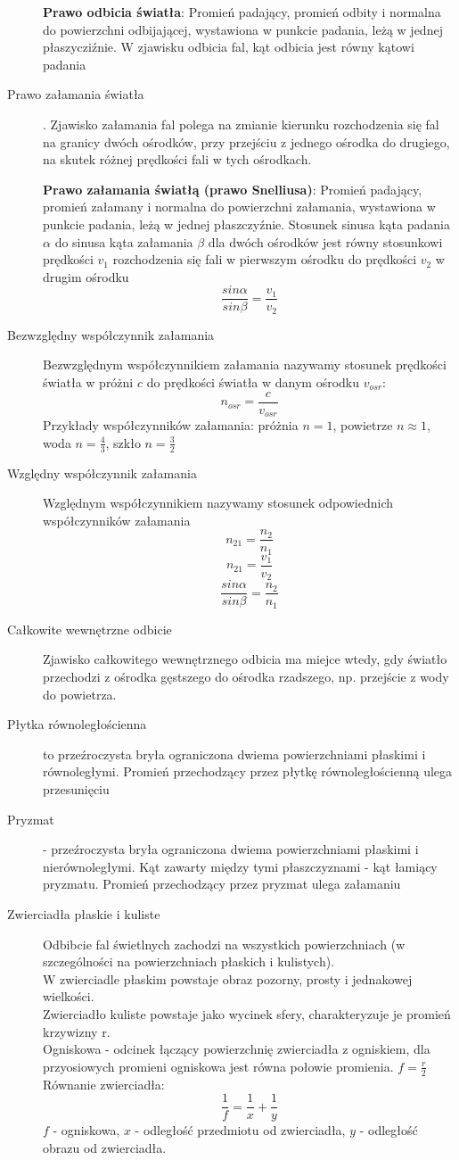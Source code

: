 \documentclass[a4paper,11pt]{article}
\begin{document}
\begin{description}
  \textbf{Prawo odbicia światła}: Promień padający, promień odbity i normalna do powierzchni odbijającej, wystawiona w punkcie padania, leżą w jednej płaszycziźnie. W zjawisku odbicia fal, kąt odbicia jest równy kątowi padania
\item[Prawo załamania światła]. Zjawisko załamania fal polega na zmianie kierunku rozchodzenia się fal na granicy dwóch ośrodków, przy przejściu z jednego ośrodka do drugiego, na skutek różnej prędkości fali w tych ośrodkach.

  \textbf{Prawo załamania światłą (prawo Snelliusa)}: Promień padający, promień załamany i normalna do powierzchni załamania, wystawiona w punkcie padania, leżą w jednej płaszczyźnie. Stosunek sinusa kąta padania $\alpha$ do sinusa kąta załamania $\beta$ dla dwóch ośrodków jest równy stosunkowi prędkości $v_1$ rozchodzenia się fali w pierwszym ośrodku do prędkości $v_2$ w drugim ośrodku
  $$\frac{sin\alpha}{sin\beta}=\frac{v_1}{v_2}$$
\item[Bezwzględny współczynnik załamania] Bezwzględnym współczynnikiem załamania nazywamy stosunek prędkości światła w próżni $c$ do prędkości światła w danym ośrodku $v_{osr}$:
  $$n_{osr}=\frac{c}{v_{osr}}$$
  Przykłady współczynników załamania: próżnia $n=1$, powietrze $n\approx 1$, woda $n=\frac{4}{3}$, szkło $n=\frac{3}{2}$ 
\item[Względny współczynnik załamania] Względnym współczynnikiem nazywamy stosunek odpowiednich współczynników załamania
  $$n_{21}=\frac{n_2}{n_1}$$
  $$n_{21}=\frac{v_1}{v_2}$$
  $$\frac{sin\alpha}{sin\beta}=\frac{n_2}{n_1}$$
\item[Całkowite wewnętrzne odbicie]
  Zjawisko całkowitego wewnętrznego odbicia ma miejce wtedy, gdy światło przechodzi z ośrodka gęstszego do ośrodka rzadszego, np. przejście z wody do powietrza.
\item[Płytka równoległościenna] to przeźroczysta bryła ograniczona dwiema powierzchniami płaskimi i równoległymi. Promień przechodzący przez płytkę równoległościenną ulega przesunięciu
\item[Pryzmat] - przeźroczysta bryła ograniczona dwiema powierzchniami płaskimi i nierównoległymi. Kąt zawarty między tymi płaszczyznami - kąt łamiący pryzmatu. Promień przechodzący przez pryzmat ulega załamaniu
\item[Zwierciadła płaskie i kuliste] Odbibcie fal świetlnych zachodzi na wszystkich powierzchniach (w szczególności na powierzchniach płaskich i kulistych). \\
  W zwierciadle płaskim powstaje obraz pozorny, prosty i jednakowej wielkości.\\
  Zwierciadło kuliste powstaje jako wycinek sfery, charakteryzuje je promień krzywizny r.\\
  Ogniskowa - odcinek łączący powierzchnię zwierciadła z ogniskiem, dla przyosiowych promieni ogniskowa jest równa połowie promienia. $f=\frac{r}{2}$\\
  Równanie zwierciadła:
  $$\frac{1}{f} = \frac{1}{x} + \frac{1}{y}$$
  $f$ - ogniskowa, $x$ - odległość przedmiotu od zwierciadła, $y$ - odległość obrazu od zwierciadła.


\end{description}
\end{document}

